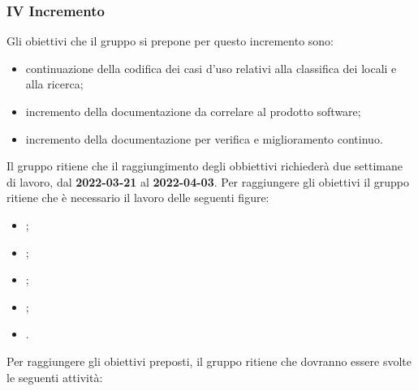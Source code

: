 \pagebreak

\subsubsection{IV Incremento}
Gli obiettivi che il gruppo si prepone per questo incremento sono:
\begin{itemize}
	\item continuazione della codifica dei casi d'uso relativi alla classifica dei locali e alla ricerca;
 	\item incremento della documentazione da correlare al prodotto software;
	\item incremento della documentazione per verifica e miglioramento continuo.
\end{itemize}
Il gruppo ritiene che il raggiungimento degli obbiettivi richiederà due settimane di lavoro, dal \textbf{2022-03-21} al \textbf{2022-04-03}.
Per raggiungere gli obiettivi il gruppo ritiene che è necessario il lavoro delle seguenti figure:
\begin{itemize}
	\item \RE{};
 	\item \AM{};
   	\item \PT{};
    \item \PR{};
   	\item \VE{}.
\end{itemize}
Per raggiungere gli obiettivi preposti, il gruppo ritiene che dovranno essere svolte le seguenti attività:
